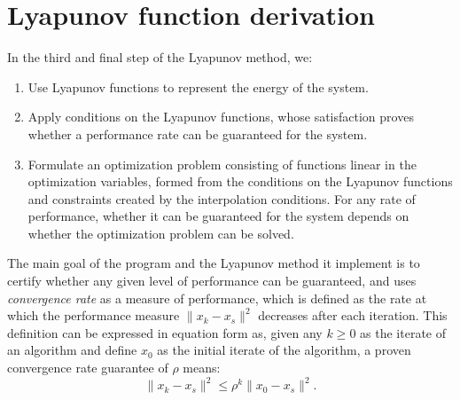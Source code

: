 \section{Lyapunov function derivation} \label{Lyapunov}
In the third and final step of the Lyapunov method, we:
\begin{enumerate}
	\item Use Lyapunov functions to represent the energy of the system.
	\item Apply conditions on the Lyapunov functions, whose satisfaction proves whether a performance rate can be guaranteed for the system.
	\item Formulate an optimization problem consisting of functions linear in the optimization variables, formed from the conditions on the Lyapunov functions and constraints created by the interpolation conditions. For any rate of performance, whether it can be guaranteed for the system depends on whether the optimization problem can be solved.
\end{enumerate}

The main goal of the program and the Lyapunov method it implement is to certify whether any given level of performance can be guaranteed, and uses \textit{convergence rate} as a measure of performance, which is defined as the rate at which the performance measure $\|x_k - x_s\|^2$ decreases after each iteration. This definition can be expressed in equation form as, given any $k \geq 0$ as the iterate of an algorithm and define $x_0$ as the initial iterate of the algorithm, a proven convergence rate guarantee of $\rho$ means:
\begin{equation} \label{eqn:convergence_rate}
	\|x_k - x_s\|^2 \leq \rho^k\|x_0 - x_s\|^2.
\end{equation}

